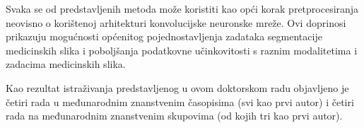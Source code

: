 Svaka se od predstavljenih metoda može koristiti kao opći korak pretprocesiranja neovisno o korištenoj arhitekturi konvolucijske neuronske mreže. Ovi doprinosi prikazuju mogućnosti općenitog pojednostavljenja zadataka segmentacije medicinskih slika i poboljšanja podatkovne učinkovitosti s raznim modalitetima i zadacima medicinskih slika.

Kao rezultat istraživanja predstavljenog u ovom doktorskom radu objavljeno je četiri rada u međunarodnim znanstvenim časopisima (svi kao prvi autor) i četiri rada na međunarodnim znanstvenim skupovima (od kojih tri kao prvi autor).